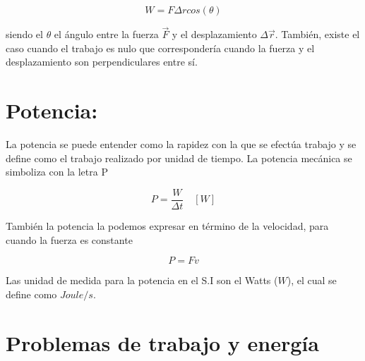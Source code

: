 \documentclass[a5paper,pagesize,10pt,bibtotoc,pointlessnumbers,
normalheadings,DIV=9,fleqn,x11names,table,twoside=false]{scrbook}
\begin{document}
\begin{equation}
W = F\Delta r cos(\theta)
\end{equation}
 
siendo el $\theta$ el ángulo entre la fuerza $\vec{F}$ y el desplazamiento $\Delta \vec{r}$. También, existe el caso cuando el 
trabajo es nulo que correspondería cuando la fuerza y el desplazamiento son perpendiculares entre sí.
  
\section{Potencia:}  

La potencia se puede entender como la rapidez con la que se efectúa trabajo y se define como el trabajo realizado por unidad de 
tiempo. La potencia mecánica se simboliza con la letra P

\begin{equation}
P = \frac{W}{\Delta t}\quad [W]
\end{equation}

También la potencia la podemos expresar en término de la velocidad, para cuando la fuerza es constante

\begin{equation}
P = Fv
\end{equation}

Las unidad de medida para la potencia en el S.I son el Watts ($W$), el cual se define como $Joule/s$.

\section{Problemas de trabajo y energía}
\end{document}
